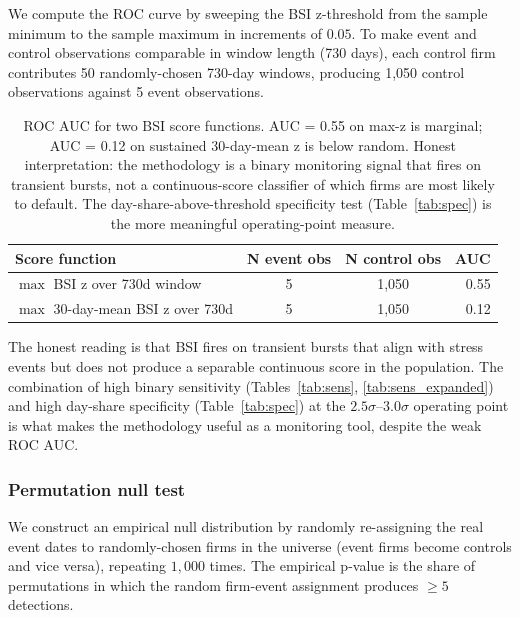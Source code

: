 \documentclass[11pt,a4paper]{article}
\begin{document}
We compute the ROC curve by sweeping the BSI z-threshold from the sample minimum to the sample maximum in increments of $0.05$. To make event and control observations comparable in window length (730 days), each control firm contributes 50 randomly-chosen 730-day windows, producing 1,050 control observations against 5 event observations.

\begin{table}[h]
\centering\small
\begin{tabular}{@{}lccr@{}}
\toprule
\textbf{Score function} & \textbf{N event obs} & \textbf{N control obs} & \textbf{AUC} \\
\midrule
$\max$ BSI z over 730d window      & 5 & 1{,}050 & 0.55 \\
$\max$ 30-day-mean BSI z over 730d & 5 & 1{,}050 & 0.12 \\
\bottomrule
\end{tabular}
\caption{ROC AUC for two BSI score functions. AUC = 0.55 on max-z is marginal; AUC = 0.12 on sustained 30-day-mean z is below random. Honest interpretation: the methodology is a binary monitoring signal that fires on transient bursts, not a continuous-score classifier of which firms are most likely to default. The day-share-above-threshold specificity test (Table~\ref{tab:spec}) is the more meaningful operating-point measure.}\label{tab:roc}
\end{table}

The honest reading is that BSI fires on transient bursts that align with stress events but does not produce a separable continuous score in the population. The combination of high binary sensitivity (Tables~\ref{tab:sens}, \ref{tab:sens_expanded}) and high day-share specificity (Table~\ref{tab:spec}) at the $2.5\sigma$--$3.0\sigma$ operating point is what makes the methodology useful as a monitoring tool, despite the weak ROC AUC.

\subsubsection{Permutation null test}

We construct an empirical null distribution by randomly re-assigning the real event dates to randomly-chosen firms in the universe (event firms become controls and vice versa), repeating $1{,}000$ times. The empirical p-value is the share of permutations in which the random firm-event assignment produces $\ge 5$ detections.
\end{document}
